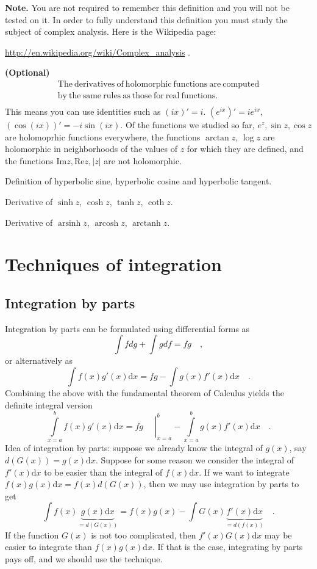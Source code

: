 \documentclass[12pt]{book}
\newcommand{\diff}{\text{d}}
\renewcommand{\Im}{\mathrm{Im}}
\renewcommand{\Re}{\mathrm{Re}}
\newcommand{\importantFormula}[1]{\begin{equation} \boxed{#1} \end{equation}}
\DeclareMathOperator{\arsinh}{arsinh}
\DeclareMathOperator{\arcosh}{arcosh}
\DeclareMathOperator{\arctanh}{arctanh}
\newcommand{\optionalMaterial}{\textbf{(Optional)}}
\begin{document}
\textbf{Note.} You are not required to remember this definition and you will not be tested on it. In order to fully understand this definition you must study the subject of complex analysis. Here is the Wikipedia page:

\url{http://en.wikipedia.org/wiki/Complex_analysis} \quad .

\optionalMaterial
\[\begin{array}{l}
\mathrm{The~derivatives~of~holomorphic~functions~are~computed} \\
\mathrm{by~the~same~rules~as~those~for~real~functions.} \\
\end{array}
\]
This means you can use identities such as $(ix)'=i$. $(e^{ix})'=ie^{ix}$, $(\cos (ix))'= -i\sin(ix)$. Of the functions we studied so far, $e^z, \sin z, \cos z$ are holomoprhic functions everywhere, the functions $\arctan z$, $\log z$ are holomorphic in neighborhoods of the values of $z$ for which they are defined, and the functions $\Im z, \Re z, |z|$ are not holomorphic.




Definition of hyperbolic sine, hyperbolic cosine and hyperbolic tangent.

Derivative of $\sinh z$, $\cosh z$, $\tanh z$, $\coth z$.

Derivative of $ \arsinh z$, $ \arcosh z$, $ \arctanh z$.
\chapter{Techniques of integration}
\section{Integration by parts}
Integration by parts can be formulated using differential forms as
\importantFormula{
\int f dg+ \int g df = fg\quad, 
}
or alternatively as
\importantFormula{
\int f(x) g'(x)\diff x = fg- \int g(x) f'(x)\diff x \quad .
}
Combining the above with the fundamental theorem of Calculus yields the definite integral version
\importantFormula{
\int\limits_{x=a}^{b} f(x) g'(x)\diff x = \left.fg\phantom\int\right|_{x=a}^b - \int\limits_{x=a}^b g(x) f'(x)\diff x \quad.
}
Idea of integration by parts: suppose we already know the integral of $g(x)$, say $d(G(x))=g(x)\diff x$. Suppose for some reason we consider the integral of $f'(x)\diff x$ to be easier than the integral of $f(x)\diff x$. If we want to integrate $f(x)g(x)\diff x= f(x)d(G(x))$, then we may use integration by parts to get
\[
\int f(x)\underbrace{g(x)\diff x}_{=d(G(x))}= f(x)g(x)- \int G(x) \underbrace{f'(x)\diff x}_{=d(f(x))}\quad .
\]
If the function $G(x)$ is not too complicated, then $f'(x)G(x)\diff x$ may be easier to integrate than $f(x)g(x)\diff x$. If that is the case, integrating by parts pays off, and we should use the technique. 
\end{document}
